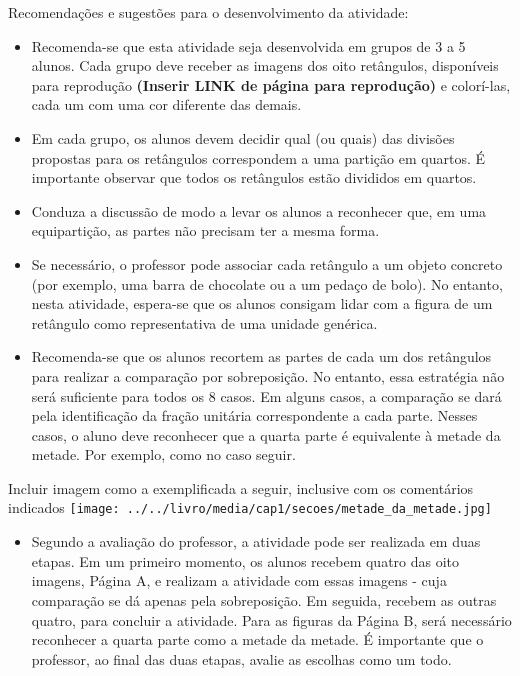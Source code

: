 \documentclass[oneside]{book}
\begin{document}
\begin{multicols}{2}
  Recomendações e sugestões para o desenvolvimento da atividade:

\begin{itemize} %
    \item       Recomenda-se que esta atividade seja desenvolvida em grupos de 3 a 5 alunos. Cada grupo deve receber as imagens dos oito retângulos, disponíveis para reprodução       {\bf (Inserir LINK de página para reprodução)}       e colorí-las, cada um com uma cor diferente das demais.
    \item       Em cada grupo, os alunos devem decidir qual (ou quais) das divisões propostas para os retângulos correspondem a uma partição em quartos. É importante observar que todos os retângulos estão divididos em quartos.
    \item       Conduza a discussão de modo a levar os alunos a reconhecer que, em uma equipartição, as partes não precisam ter a mesma forma.
    \item       Se necessário, o professor pode associar cada retângulo a um objeto concreto (por exemplo, uma barra de chocolate ou a um pedaço de bolo). No entanto, nesta atividade, espera-se que os alunos consigam lidar com a figura de um retângulo como representativa de uma unidade genérica.
    \item       Recomenda-se que os alunos recortem as partes de cada um dos retângulos para realizar a comparação por sobreposição. No entanto, essa estratégia não será suficiente para todos os 8 casos. Em alguns casos, a comparação se dará pela identificação da fração unitária correspondente a cada parte. Nesses casos, o aluno deve reconhecer que a quarta parte é equivalente à metade da metade. Por exemplo, como no caso seguir.
\end{itemize} %


  \begin{imagem*}[breakable]{}{}     Incluir imagem como a exemplificada a seguir, inclusive com os comentários indicados
        \texttt{[image: ../../livro/media/cap1/secoes/metade\_da\_metade.jpg]}
  \end{imagem*}

\begin{itemize} %
    \item       Segundo a avaliação do professor, a atividade pode ser realizada em duas etapas. Em um primeiro momento, os alunos recebem quatro das oito imagens, Página A, e realizam a atividade com essas imagens - cuja comparação se dá apenas pela sobreposição. Em seguida, recebem as outras quatro, para concluir a atividade. Para as figuras da Página B, será necessário reconhecer a quarta parte como a metade da metade. É importante que o professor, ao final das duas etapas, avalie as escolhas como um todo.
\end{itemize} %







\end{multicols}
\end{document}
